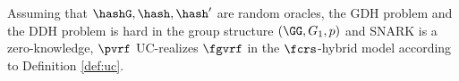 \newcommand{\malkeys}{\mathsf{malicious}\_\vklist}
\newcommand{\hkeys}{\mathsf{honest}\_\vklist}
\begin{theorem}
	Assuming that $ \hashG, \hash, \hash' $ are random oracles, the GDH problem and the DDH problem is hard in the group structure $ (\GG, G_1, p) $ and SNARK is a zero-knowledge, $\pvrf$ UC-realizes $\fgvrf$ in the $\fcrs$-hybrid model according to Definition \ref{def:uc}.
\end{theorem}

